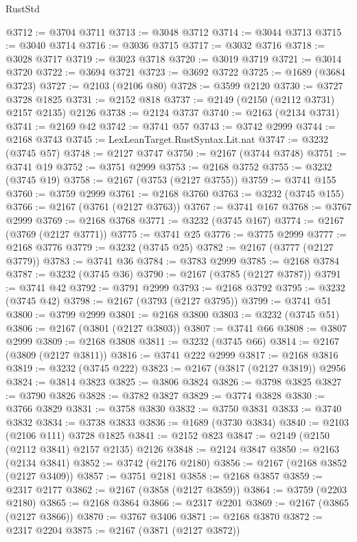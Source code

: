 \begin{lexlean}{RustStd}
\begin{coremodule}
@3712 := @3704 @3711
@3713 := @3048 @3712
@3714 := @3044 @3713
@3715 := @3040 @3714
@3716 := @3036 @3715
@3717 := @3032 @3716
@3718 := @3028 @3717
@3719 := @3023 @3718
@3720 := @3019 @3719
@3721 := @3014 @3720
@3722 := @3694 @3721
@3723 := @3692 @3722
@3725 := @1689 (@3684 @3723)
@3727 := @2103 (@2106 @80)
@3728 := @3599 @2120
@3730 := @3727 @3728 @1825
@3731 := @2152 @818
@3737 := @2149 (@2150 (@2112 @3731) @2157 @2135) @2126
@3738 := @2124 @3737
@3740 := @2163 (@2134 @3731)
@3741 := @2169 @42
@3742 := @3741 @57
@3743 := @3742 @2999
@3744 := @2168 @3743
@3745 := LexLeanTarget.RustSyntax.Lit.nat
@3747 := @3232 (@3745 @57)
@3748 := @2127 @3747
@3750 := @2167 (@3744 @3748)
@3751 := @3741 @19
@3752 := @3751 @2999
@3753 := @2168 @3752
@3755 := @3232 (@3745 @19)
@3758 := @2167 (@3753 (@2127 @3755))
@3759 := @3741 @155
@3760 := @3759 @2999
@3761 := @2168 @3760
@3763 := @3232 (@3745 @155)
@3766 := @2167 (@3761 (@2127 @3763))
@3767 := @3741 @167
@3768 := @3767 @2999
@3769 := @2168 @3768
@3771 := @3232 (@3745 @167)
@3774 := @2167 (@3769 (@2127 @3771))
@3775 := @3741 @25
@3776 := @3775 @2999
@3777 := @2168 @3776
@3779 := @3232 (@3745 @25)
@3782 := @2167 (@3777 (@2127 @3779))
@3783 := @3741 @36
@3784 := @3783 @2999
@3785 := @2168 @3784
@3787 := @3232 (@3745 @36)
@3790 := @2167 (@3785 (@2127 @3787))
@3791 := @3741 @42
@3792 := @3791 @2999
@3793 := @2168 @3792
@3795 := @3232 (@3745 @42)
@3798 := @2167 (@3793 (@2127 @3795))
@3799 := @3741 @51
@3800 := @3799 @2999
@3801 := @2168 @3800
@3803 := @3232 (@3745 @51)
@3806 := @2167 (@3801 (@2127 @3803))
@3807 := @3741 @66
@3808 := @3807 @2999
@3809 := @2168 @3808
@3811 := @3232 (@3745 @66)
@3814 := @2167 (@3809 (@2127 @3811))
@3816 := @3741 @222 @2999
@3817 := @2168 @3816
@3819 := @3232 (@3745 @222)
@3823 := @2167 (@3817 (@2127 @3819)) @2956
@3824 := @3814 @3823
@3825 := @3806 @3824
@3826 := @3798 @3825
@3827 := @3790 @3826
@3828 := @3782 @3827
@3829 := @3774 @3828
@3830 := @3766 @3829
@3831 := @3758 @3830
@3832 := @3750 @3831
@3833 := @3740 @3832
@3834 := @3738 @3833
@3836 := @1689 (@3730 @3834)
@3840 := @2103 (@2106 @111) @3728 @1825
@3841 := @2152 @823
@3847 := @2149 (@2150 (@2112 @3841) @2157 @2135) @2126
@3848 := @2124 @3847
@3850 := @2163 (@2134 @3841)
@3852 := @3742 (@2176 @2180)
@3856 := @2167 (@2168 @3852 (@2127 @3409))
@3857 := @3751 @2181
@3858 := @2168 @3857
@3859 := @2317 @2177
@3862 := @2167 (@3858 (@2127 @3859))
@3864 := @3759 (@2203 @2180)
@3865 := @2168 @3864
@3866 := @2317 @2201
@3869 := @2167 (@3865 (@2127 @3866))
@3870 := @3767 @3406
@3871 := @2168 @3870
@3872 := @2317 @2204
@3875 := @2167 (@3871 (@2127 @3872))

\end{coremodule}
\end{lexlean}
